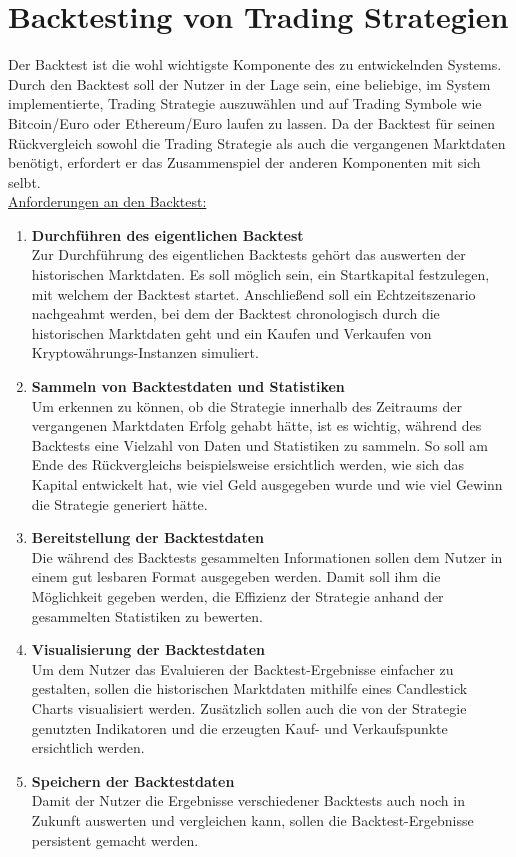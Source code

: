 \documentclass[oneside]{ausarbeitung}
\begin{document}
\section{Backtesting von Trading Strategien}
\label{sec:backtesting}

Der Backtest ist die wohl wichtigste Komponente des zu entwickelnden
Systems. Durch den Backtest soll der Nutzer in der Lage sein, eine
beliebige, im System implementierte, Trading Strategie auszuwählen
und auf Trading Symbole wie Bitcoin/Euro oder Ethereum/Euro laufen zu
lassen. Da der Backtest für seinen Rückvergleich sowohl die Trading
Strategie als auch die vergangenen Marktdaten benötigt, erfordert er
das Zusammenspiel der anderen Komponenten mit sich selbt. \\

\underline{Anforderungen an den Backtest:}
\begin{enumerate}
	\item \textbf{Durchführen des eigentlichen Backtest} \\
		Zur Durchführung des eigentlichen Backtests gehört das auswerten der 
		historischen Marktdaten. Es soll möglich sein, ein Startkapital
		festzulegen, mit welchem der Backtest startet. Anschließend soll ein
		Echtzeitszenario nachgeahmt werden, bei dem der Backtest chronologisch
		durch die historischen Marktdaten geht und ein Kaufen und Verkaufen von
		Kryptowährungs-Instanzen simuliert.  
	\item \textbf{Sammeln von Backtestdaten und Statistiken} \\
		Um erkennen zu können, ob die Strategie innerhalb des Zeitraums der 
		vergangenen Marktdaten Erfolg gehabt hätte, ist es wichtig, während des 
		Backtests eine Vielzahl	von Daten und Statistiken zu sammeln. So soll am
		Ende des Rückvergleichs beispielsweise ersichtlich werden, wie sich das
		Kapital entwickelt hat, wie viel Geld ausgegeben wurde und wie viel
		Gewinn die Strategie generiert hätte.
	\item \textbf{Bereitstellung der Backtestdaten} \\
		Die während des Backtests gesammelten Informationen sollen dem Nutzer
		in einem gut lesbaren Format ausgegeben werden. Damit soll ihm
		die Möglichkeit gegeben werden, die Effizienz der Strategie anhand der
		gesammelten Statistiken zu bewerten.
	\item \textbf{Visualisierung der Backtestdaten} \\
		Um dem Nutzer das Evaluieren der Backtest-Ergebnisse einfacher zu
		gestalten, sollen die historischen Marktdaten mithilfe eines
		Candlestick Charts visualisiert werden. Zusätzlich sollen auch die
		von der Strategie genutzten Indikatoren und die erzeugten Kauf- und
		Verkaufspunkte ersichtlich werden.
	\item \textbf{Speichern der Backtestdaten} \\
		Damit der Nutzer die Ergebnisse verschiedener Backtests auch noch in
		Zukunft auswerten und vergleichen kann, sollen die Backtest-Ergebnisse
		persistent gemacht werden.
\end{enumerate}
\end{document}
